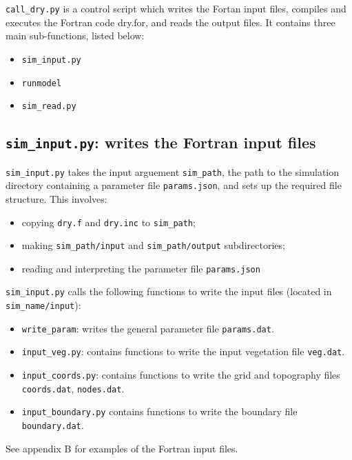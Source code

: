 \documentclass{article}
\newcommand{\code}[1]{\texttt{#1}}
\begin{document}
 \code{call\_dry.py}  is a control script which writes the Fortan input files, compiles and executes the Fortran code dry.for, and reads the output files. 
It contains three main sub-functions, listed below:
 \begin{itemize}
		\item \code{sim\_input.py} 
		\item \code{runmodel}
		\item \code{sim\_read.py}
 \end{itemize}
 


 
\subsection{\code{sim\_input.py}: writes the Fortran input files}


\code{sim\_input.py} takes the input arguement \code{sim\_path}, the path to the simulation directory containing a parameter file \code{params.json}, and sets up the required file structure. This involves:
\begin{itemize}
	\item copying \code{dry.f} and \code{dry.inc} to \code{sim\_path};
	\item making \code{sim\_path/input} and \code{sim\_path/output} subdirectories;
	\item  reading and interpreting the parameter file \code{params.json}    
\end{itemize}   


\code{sim\_input.py} calls the following functions to write the input files (located in \code{sim\_name/input}):
\begin{itemize}
	\item \code{write\_param}: writes the general parameter file  \code{params.dat}.
	\item \code{input\_veg.py}: contains functions to write the input vegetation file \code{veg.dat}.
	\item \code{input\_coords.py}: contains functions to write the  grid and topography files \code{coords.dat}, \code{nodes.dat}. 
	\item \code{input\_boundary.py} contains functions to write the boundary file \code{boundary.dat}.
\end{itemize}

See appendix B for examples of the Fortran input files.
\end{document}
